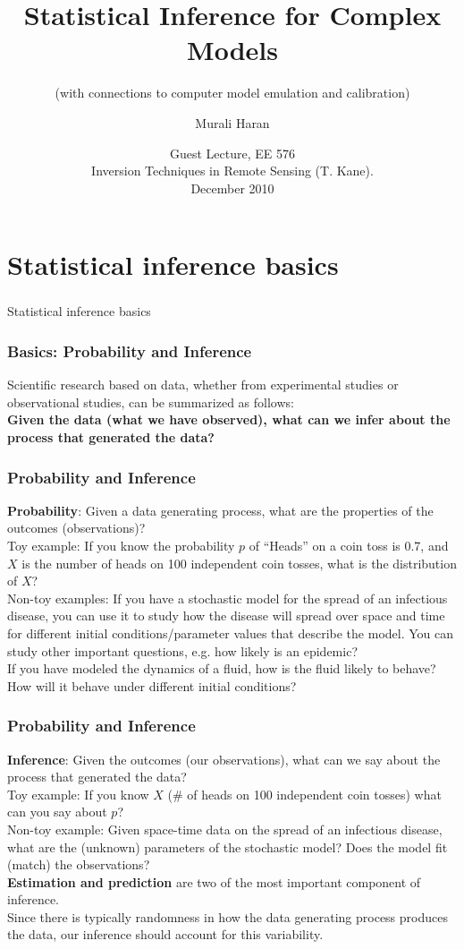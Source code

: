 \documentclass{beamer}
\title[Spatial Models and Computation] %
{Statistical Inference for Complex Models}
\subtitle{(with connections to computer model emulation and calibration)}
\author{Murali Haran}
\institute[Penn State] %
{
  Department of Statistics\\
  Penn State University\\
\vspace{0.2in}
}
\date[SOS 03-2006] %
{Guest Lecture, EE 576\\ Inversion Techniques in Remote Sensing (T. Kane). \\ December 2010}
\begin{document}
\begin{frame}
  \titlepage
\end{frame}

\section{Statistical inference basics}


\begin{frame}
\frametitle{ }
\begin{center}
{\LARGE Statistical inference basics}
\end{center}
\end{frame}

\begin{frame}
  \frametitle{Basics: Probability and Inference}
Scientific research based on data, whether from experimental studies or observational studies, can be summarized as follows:\\
{\bf {\color{blue} Given the data (what we have observed), what can we infer about the process that generated the data?}}
\end{frame}

\begin{frame}
  \frametitle{Probability and Inference}
  {\bf Probability}: Given a data generating process, what are the properties of the outcomes (observations)?\\
  Toy example: If you know the probability $p$ of ``Heads'' on a coin
  toss is 0.7, and $X$ is the number of heads on 100 independent coin tosses, what is the
  distribution of $X$?\\
  Non-toy examples: If you have a stochastic model for the spread of an infectious disease, you can use it to study how the disease will spread over space and time for different initial conditions/parameter values that describe the model. You can study other important questions, e.g. how likely is an epidemic?\\
If you have modeled the dynamics of a fluid, how is the fluid likely to behave? How will it behave under different initial conditions?
\end{frame}

\begin{frame}
\frametitle{Probability and Inference}
{\bf Inference}: Given the outcomes (our observations), what can we say about the process that generated the data?\\
Toy example: If you know $X$ (\# of heads on 100 independent coin tosses) what can you say about $p$?\\
Non-toy example: Given space-time data on the spread of an infectious disease, what are the (unknown) parameters of the stochastic model?  Does the model fit (match) the observations?\\
{\bf Estimation and prediction} are two of the most important component of inference.\\
 Since there is typically randomness in how the data generating process produces the data, our inference should account for this variability. 
\end{frame}
\end{document}
